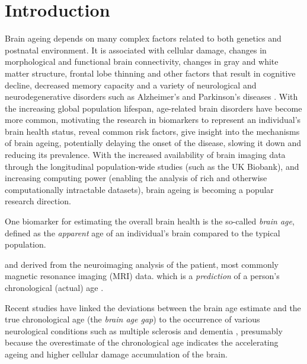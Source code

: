 \chapter{Introduction}


Brain ageing depends on many complex factors related to both genetics and postnatal environment. It is associated with cellular damage, changes in morphological and functional brain connectivity, changes in gray and white matter structure, frontal lobe thinning and other factors that result in cognitive decline, decreased memory capacity and a variety of neurological and neurodegenerative disorders such as Alzheimer's and Parkinson's diseases \cite{cole2018brain, niu2019improved, franke2019ten}. With the increasing global population lifespan, age-related brain disorders have become more common, motivating the research in biomarkers to represent an individual's brain health status, reveal common risk factors, give insight into the mechanisms of brain ageing, potentially delaying the onset of the disease, slowing it down and reducing its prevalence. With the increased availability of brain imaging data through the longitudinal population-wide studies (such as the UK Biobank), and increasing computing power (enabling the analysis of rich and otherwise computationally intractable datasets), brain ageing is becoming a popular research direction.

One biomarker for estimating the overall brain health is the so-called \textit{brain age}, defined as the \textit{apparent} age of an individual's brain compared to the typical population.

and derived from the neuroimaging analysis of the patient, most commonly magnetic resonance imaging (MRI) data. which is a \textit{prediction} of a person's chronological (actual) age .

Recent studies have linked the deviations between the brain age estimate and the true chronological age (the \textit{brain age gap}) to the occurrence of various neurological conditions such as multiple sclerosis and dementia \cite{kaufmann2019}, presumably because the overestimate of the chronological age indicates the accelerating ageing and higher cellular damage accumulation of the brain.

